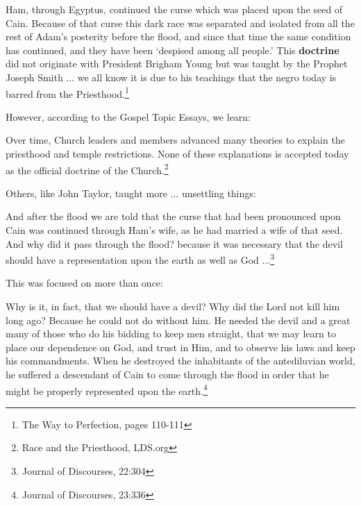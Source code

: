 \documentclass{article}
\begin{document}
\begin{displayquote}
Ham, through Egyptus, continued the curse which was placed upon the seed of 
Cain. Because of that curse this dark race was separated and isolated from all 
the rest of Adam's posterity before the flood, and since that time the same 
condition has continued, and they have been `despised among all people.' 
This \textbf{doctrine} did not originate with President Brigham Young but was 
taught by the Prophet Joseph Smith ... we all know it is due to his teachings 
that the negro today is barred from the 
Priesthood.\footnote{The Way to Perfection, pages 110-111}
\end{displayquote}

However, according to the Gospel Topic Essays, we learn:

\begin{displayquote}
Over time, Church leaders and members advanced many theories to explain the 
priesthood and temple restrictions. None of these explanations is accepted 
today as the official doctrine of the 
Church.\footnote{Race and the Priesthood, LDS.org}
\end{displayquote}

Others, like John Taylor, taught more ... unsettling things:

\begin{displayquote}
And after the flood we are told that the curse that had been pronounced upon 
Cain was continued through Ham's wife, as he had married a wife of that seed. 
And why did it pass through the flood? because it was necessary that the devil 
should have a representation upon the earth as well as 
God ...\footnote{Journal of Discourses, 22:304}
\end{displayquote}

This was focused on more than once:

\begin{displayquote}
Why is it, in fact, that we should have a devil? Why did the Lord not kill 
him long ago? Because he could not do without him. He needed the devil and a 
great many of those who do his bidding to keep men straight, that we may learn 
to place our dependence on God, and trust in Him, and to observe his laws and 
keep his commandments. When he destroyed the inhabitants of the antediluvian 
world, he suffered a descendant of Cain to come through the flood in order 
that he might be properly represented upon the 
earth.\footnote{Journal of Discourses, 23:336}
\end{displayquote}
\end{document}
